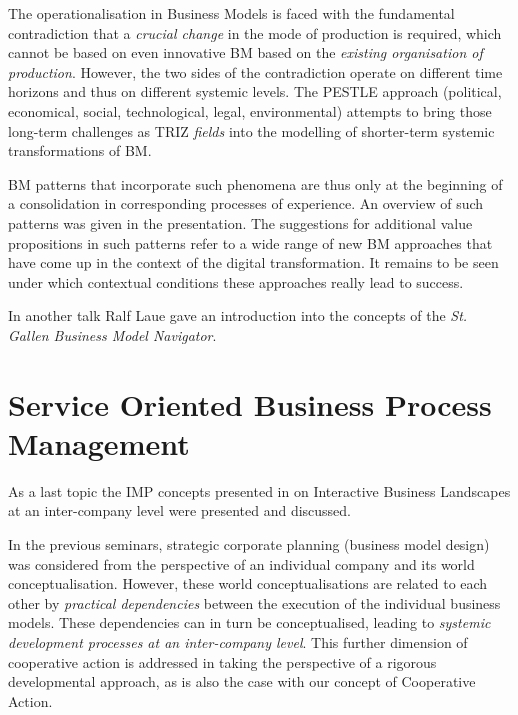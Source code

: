 \documentclass[11pt,a4paper]{article}
\begin{document}
The operationalisation in Business Models is faced with the fundamental
contradiction that a \emph{crucial change} in the mode of production is
required, which cannot be based on even innovative BM based on the
\emph{existing organisation of production}. However, the two sides of the
contradiction operate on different time horizons and thus on different
systemic levels. The PESTLE approach (political, economical, social,
technological, legal, environmental) attempts to bring those long-term
challenges as TRIZ \emph{fields} into the modelling of shorter-term systemic
transformations of BM.

BM patterns that incorporate such phenomena are thus only at the beginning of
a consolidation in corresponding processes of experience. An overview of such
patterns was given in the presentation. The suggestions for additional value
propositions in such patterns refer to a wide range of new BM approaches that
have come up in the context of the digital transformation. It remains to be
seen under which contextual conditions these approaches really lead to
success.

In another talk Ralf Laue gave an introduction into the concepts of the
\emph{St. Gallen Business Model Navigator}.

\section{Service  Oriented Business Process Management}

As a last topic the IMP concepts presented in \cite{FordMouzas2013} on
Interactive Business Landscapes at an inter-company level were presented and
discussed.

In the previous seminars, strategic corporate planning (business model design)
was considered from the perspective of an individual company and its world
conceptualisation. However, these world conceptualisations are related to each
other by \emph{practical dependencies} between the execution of the individual
business models. These dependencies can in turn be conceptualised, leading to
\emph{systemic development processes at an inter-company level}.  This further
dimension of cooperative action is addressed in \cite{FordMouzas2013} taking
the perspective of a rigorous developmental approach, as is also the case with
our concept of Cooperative Action.
\end{document}
